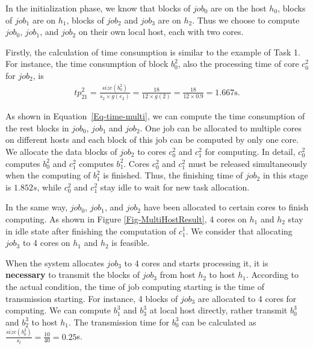 \documentclass{llncs}
\begin{document}
In the initialization phase, we know that blocks of $job_0$ are on the host $h_0$, blocks of $job_1$ are on $h_1$, blocks of $job_2$ and $job_3$ are on $h_2$. Thus we choose to compute $job_0$, $job_1$, and $job_2$ on their own local host, each with two cores.

Firstly, the calculation of time consumption is similar to the example of Task 1. For instance, the time consumption of block $b^2_0$, also the processing time of core $c^2_0$ for $job_2$, is 
\begin{equation}
\begin{aligned}
{tp}^2_{21}=\frac{size(b^2_0)}{s_2\times{g(e_2)}}=\frac{18}{12\times{g(2)}}=\frac{18}{12\times0.9}=1.667\text{s}.
\label{Eq-time-multi}
\end{aligned}
\end{equation}

As shown in Equation~\eqref{Eq-time-multi}, we can compute the time consumption of the rest blocks in $job_0$, $job_1$ and $job_2$. One job can be allocated to multiple cores on different hosts and each block of this job can be computed by only one core. We allocate the data blocks of $job_2$ to cores $c^2_0$ and $c^2_1$ for computing. In detail, $c^2_0$ computes $b^2_0$ and $c^2_1$ computes $b^2_1$. Cores $c^2_0$ and $c^2_1$ must be released simultaneously when the computing of $b^2_1$ is finished. Thus, the finishing time of $job_2$ in this stage is $1.852s$, while $c^2_0$ and $c^2_1$ stay idle to wait for new task allocation.

In the same way, $job_0$, $job_1$, and $job_2$ have been allocated to certain cores to finish computing. As shown in Figure \ref{Fig-MultiHostResult}, 4 cores on $h_1$ and $h_2$ stay in idle state after finishing the computation of $c^1_1$. We consider that allocating $job_3$ to 4 cores on $h_1$ and $h_2$ is feasible.

When the system allocates $job_3$ to 4 cores and starts processing it, it is \textbf{necessary} to transmit the blocks of $job_3$ from host $h_2$ to host $h_1$. According to the actual condition, the time of job computing starting is the time of transmission starting. For instance, 4 blocks of $job_3$ are allocated to 4 cores for computing. We can compute $b^3_1$ and $b^3_3$ at local host directly, rather transmit $b^3_0$ and $b^3_2$ to host $h_1$. The transmission time for $b^3_0$ can be calculated as $\frac{size(b^3_0)}{s_t}=\frac{10}{40}=0.25$s.

\end{document}
